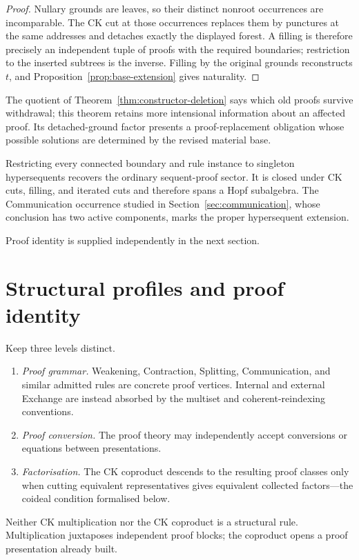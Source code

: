 \documentclass[10pt,a4paper]{article}
\theoremstyle{plain}
\theoremstyle{definition}
\theoremstyle{remark}
\begin{document}
\begin{proof}
Nullary grounds are leaves, so their distinct nonroot occurrences are
incomparable.  The CK cut at those occurrences replaces them by punctures
at the same addresses
and detaches exactly the displayed forest.  A filling is therefore
precisely an independent tuple of proofs with the required boundaries;
restriction to the inserted subtrees is the inverse.  Filling by the original
grounds reconstructs \(t\), and Proposition~\ref{prop:base-extension}
gives naturality.
\end{proof}

The quotient of Theorem~\ref{thm:constructor-deletion} says which old proofs
survive withdrawal; this theorem retains more intensional information about
an affected proof.  Its detached-ground factor presents a proof-replacement
obligation whose possible solutions are determined by the revised material
base.

Restricting every connected boundary and rule instance to singleton
hypersequents recovers the ordinary sequent-proof sector.  It is closed
under CK cuts, filling, and iterated cuts and therefore spans
a Hopf subalgebra.  The Communication occurrence studied in
Section~\ref{sec:communication}, whose conclusion has two active
components, marks the proper hypersequent extension.

Proof identity is supplied independently in the next section.

\section{Structural profiles and proof identity}
\label{sec:identity}

Keep three levels distinct.
\begin{enumerate}[label=(\roman*)]
\item \emph{Proof grammar.}  Weakening, Contraction, Splitting,
Communication, and similar admitted rules are concrete proof vertices.
Internal and external Exchange are instead absorbed by the multiset and
coherent-reindexing conventions.
\item \emph{Proof conversion.}  The proof theory may independently accept
conversions or equations between presentations.
\item \emph{Factorisation.}  The CK coproduct descends to the resulting
proof classes only when cutting equivalent representatives gives
equivalent collected factors---the coideal condition formalised below.
\end{enumerate}
Neither CK multiplication nor the CK coproduct is a structural rule.
Multiplication juxtaposes independent proof blocks; the coproduct opens a
proof presentation already built.
\end{document}
